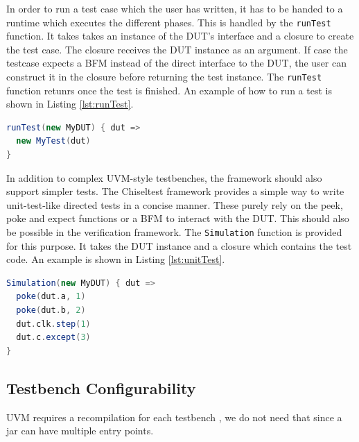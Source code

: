 \documentclass[11pt,a4paper]{report}
\newcommand{\ttt}{\texttt}
\begin{document}
In order to run a test case which the user has written, it has to be handed to a runtime which executes the different
phases. This is handled by the \ttt{runTest} function. It takes takes an instance of the DUT's interface and a
closure to create the test case. The closure receives the DUT instance as an argument. If case the testcase expects a
BFM instead of the direct interface to the DUT, the user can construct it in the closure before returning the test
instance. The \ttt{runTest} function retunrs once the test is finished. An example of how to run a test is shown in
Listing \ref{lst:runTest}.

\begin{listing}
\begin{lstlisting}[language=scala, captionpos=b, caption=Example code for running a test case using the verification framework.,label=lst:runTest]
runTest(new MyDUT) { dut =>
  new MyTest(dut)
}
\end{lstlisting}
\end{listing}

In addition to complex UVM-style testbenches, the framework should also support simpler tests. The Chiseltest
framework provides a simple way to write unit-test-like directed tests in a concise manner. These purely rely on the
peek, poke and expect functions or a BFM to interact with the DUT. This should also be possible in the verification
framework. The \ttt{Simulation} function is provided for this purpose. It takes the DUT instance and a closure which
contains the test code. An example is shown in Listing \ref{lst:unitTest}.

\begin{listing}
\begin{lstlisting}[language=scala, captionpos=b, caption=Example code for running a test case using the verification framework.,label=lst:unitTest]
Simulation(new MyDUT) { dut =>
  poke(dut.a, 1)
  poke(dut.b, 2)
  dut.clk.step(1)
  dut.c.except(3)
}
\end{lstlisting}
\end{listing}

\subsection{Testbench Configurability} %

UVM requires a recompilation for each testbench \cite{salemi2013uvm}, we do not need that since a jar can have
multiple entry points.
\end{document}
